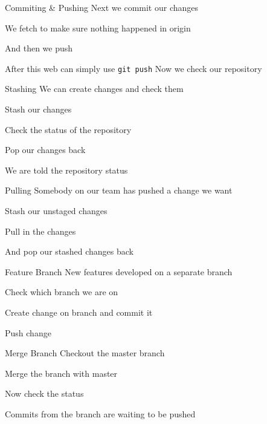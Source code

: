 \documentclass{beamer}
\begin{document}
  \begin{frame}[fragile=singleslide]{Commiting \& Pushing}
    Next we commit our changes
    
    We fetch to make sure nothing happened in origin
    
  \end{frame}
  \begin{frame}[fragile=singleslide]
    And then we push
    
    After this web can simply use \texttt{git push}
    Now we check our repository
    
  \end{frame}
  \begin{frame}[fragile=singleslide]{Stashing}
    We can create changes and check them
    
  \end{frame}
  \begin{frame}[fragile=singleslide]
    Stash our changes
    
    Check the status of the repository
    
  \end{frame}
  \begin{frame}[fragile=singleslide]
    Pop our changes back
    
    We are told the repository status
  \end{frame}
  \begin{frame}[fragile=singleslide]{Pulling}
    Somebody on our team has pushed a change we want
    
    Stash our unstaged changes
    
  \end{frame}
  \begin{frame}[fragile=singleslide]
    Pull in the changes
    
  \end{frame}
  \begin{frame}[fragile=singleslide]
    And pop our stashed changes back
    
  \end{frame}
  \begin{frame}[fragile=singleslide]{Feature Branch}
    New features developed on a separate branch
    
    Check which branch we are on
    
  \end{frame}
  \begin{frame}[fragile=singleslide]
    Create change on branch and commit it
    
    Push change
    
  \end{frame}
  \begin{frame}[fragile=singleslide]{Merge Branch}
    Checkout the master branch
    
    Merge the branch with master
    
  \end{frame}
  \begin{frame}[fragile=singleslide]
    Now check the status
    
    Commits from the branch are waiting to be pushed
  \end{frame}
\end{document}

